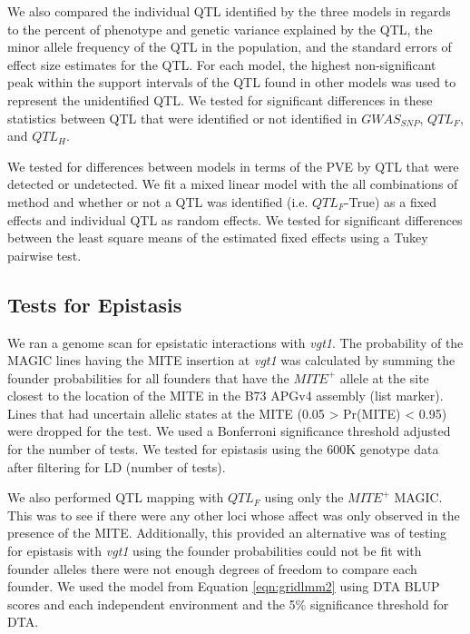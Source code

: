 \documentclass[article,9pt,twocolumn,twoside]{rilabRxiv}
\begin{document}
We also compared the individual QTL identified by the three models in regards to the percent of phenotype and genetic variance explained by the QTL, the minor allele frequency of the QTL in the population, and the standard errors of effect size estimates for the QTL. For each model, the highest non-significant peak within the support intervals of the QTL found in other models was used to represent the unidentified QTL. We tested for significant differences in these statistics between QTL that were identified or not identified in $GWAS_{SNP}$, $QTL_F$, and $QTL_H$.

We tested for differences between models in terms of the PVE by QTL that were detected or undetected. We fit a mixed linear model with the all combinations of method and whether or not a QTL was identified (i.e. $QTL_F$-True) as a fixed effects and individual QTL as random effects. We tested for significant differences between the least square means of the estimated fixed effects using a Tukey pairwise test.

\subsection{Tests for Epistasis}
We ran a genome scan for epsistatic interactions with \emph{vgt1}. The probability of the MAGIC lines having the MITE insertion at \emph{vgt1} was calculated by summing the founder probabilities for all founders that have the $MITE^+$ allele at the site closest to the location of the MITE in the B73 APGv4 assembly (list marker).
Lines that had uncertain allelic states at the MITE (0.05 > Pr(MITE) < 0.95) were dropped for the test.
We used a Bonferroni significance threshold adjusted for the number of tests.
We tested for epistasis using the 600K genotype data after filtering for LD (number of tests).

We also performed QTL mapping with $QTL_F$ using only the $MITE^+$ MAGIC.
This was to see if there were any other loci whose affect was only observed in the presence of the MITE.
Additionally, this provided an alternative was of testing for epistasis with \emph{vgt1} using the founder probabilities could not be fit with founder alleles there were not enough degrees of freedom to compare each founder.
We used the model from Equation \ref{eqn:gridlmm2} using DTA BLUP scores and each independent environment and the 5\% significance threshold for DTA.
\end{document}
